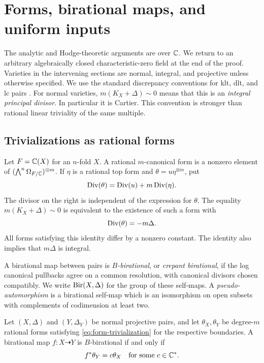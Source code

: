 \section{Forms, birational maps, and uniform inputs}
\label{sec:preliminaries}

The analytic and Hodge-theoretic arguments are over $\mathbb C$. We return to an
arbitrary algebraically closed characteristic-zero field at the end of
the proof. Varieties in the intervening sections are normal, integral,
and projective unless otherwise specified. We use the standard discrepancy
conventions for klt, dlt, and lc pairs \citep{Kollar2013}.
For normal varieties, $m(K_X+\Delta)\sim0$ means that this is an
\emph{integral principal divisor}. In particular it is Cartier. This
convention is stronger than rational linear triviality of the same
multiple.

\subsection{Trivializations as rational forms}

Let $F=\mathbb C(X)$ for an $n$-fold $X$. A rational $m$-canonical form is a
nonzero element of
$(\bigwedge^n\Omega_{F/\mathbb C})^{\otimes m}$. If $\eta$ is a rational
top form and $\theta=u\eta^{\otimes m}$, put
\[
                     \operatorname{Div}(\theta)=\operatorname{Div}(u)+m\operatorname{Div}(\eta).
\]
The divisor on the right is independent of the expression for $\theta$.
The equality $m(K_X+\Delta)\sim0$ is equivalent to the existence of
such a form with
\begin{equation}\label{eq:form-trivialization}
                         \operatorname{Div}(\theta)=-m\Delta.
\end{equation}
All forms satisfying this identity differ by a nonzero constant.
The identity also implies that $m\Delta$ is integral.

A birational map between pairs is \emph{$B$-birational}, or
\emph{crepant birational}, if the log canonical pullbacks agree on a
common resolution, with canonical divisors chosen compatibly. We write
$\operatorname{Bir}(X,\Delta)$ for the group of these self-maps. A
\emph{pseudo-automorphism} is a birational self-map which is an
isomorphism on open subsets with complements of codimension at least two.

\begin{lemma}\label{lem:form-crepant}
Let $(X,\Delta)$ and $(Y,\Delta_Y)$ be normal projective pairs, and let
$\theta_X,\theta_Y$ be degree-$m$ rational forms satisfying
\eqref{eq:form-trivialization} for the respective boundaries.
A birational map $f:X\dashrightarrow Y$ is $B$-birational if and only if
\[
                       f^*\theta_Y=c\theta_X
                 \quad\text{for some }c\in\mathbb C^*.
\]
\end{lemma}

